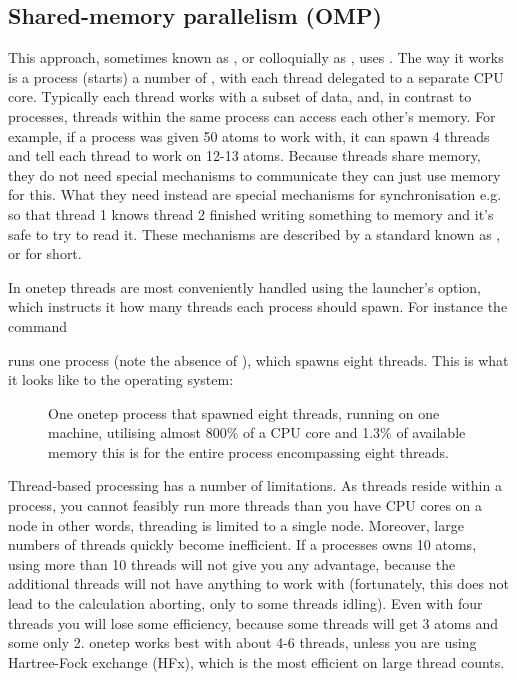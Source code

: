 \documentclass[letterpaper,10pt,english]{sphinxmanual}
\begin{document}
\subsection{Shared-memory parallelism (OMP)}
\label{\detokenize{starting_with_onetep:shared-memory-parallelism-omp}}
This approach, sometimes known as , 
or colloquially as , uses . The way it works is
a process  (starts) a number of , with
each thread delegated to a separate CPU core. Typically each thread
works with a subset of data, and, in contrast to processes, threads
within the same process can access each other’s memory. For example, if
a process was given 50 atoms to work with, it can spawn 4 threads and
tell each thread to work on 12-13 atoms. Because threads share memory,
they do not need special mechanisms to communicate \textendash{} they can just use
memory for this. What they need instead are special mechanisms for
synchronisation \textendash{} e.g. so that thread 1 knows thread 2 finished writing
something to memory and it’s safe to try to read it. These mechanisms
are described by a standard known as , or  for short.

In onetep threads are most conveniently handled using the launcher’s
 option, which instructs it how many threads each process should
spawn. For instance the command


runs one process (note the absence of ), which spawns eight
threads. This is what it looks like to the operating system:

\begin{figure}[htbp]
\centering
\capstart

\noindent{}
\caption{One onetep process that spawned eight threads, running on one machine, utilising almost 800\% of a CPU core and 1.3\% of available memory \textendash{} this is for the entire process encompassing eight threads.}\label{\detokenize{starting_with_onetep:id5}}\end{figure}

Thread-based processing has a number of limitations. As threads reside
within a process, you cannot feasibly run more threads than you have CPU
cores on a node \textendash{} in other words, threading is limited to a single node.
Moreover, large numbers of threads quickly become inefficient. If a
processes owns 10 atoms, using more than 10 threads will not give you
any advantage, because the additional threads will not have anything to
work with (fortunately, this does not lead to the calculation aborting,
only to some threads idling). Even with four threads you will lose some
efficiency, because some threads will get 3 atoms and some only 2.
onetep works best with about 4-6 threads, unless you are using
Hartree-Fock exchange (HFx), which is the most efficient on large thread
counts.
\end{document}
